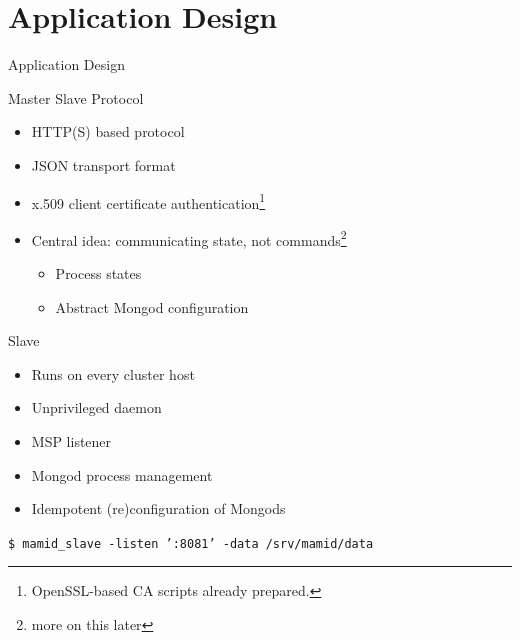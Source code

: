 \documentclass[11pt,aspectratio=169]{beamer}
\begin{document}
   
    
    \section{Application Design}
    
    \begin{frame}[label=appdesign]{Application Design}
    \end{frame}
       
   \begin{frame}{Master Slave Protocol}
       \begin{itemize}
           \item HTTP(S) based protocol
           \item JSON transport format
           \item x.509 client certificate authentication\footnote{OpenSSL-based CA scripts already prepared.}
           \item Central idea: communicating state, not commands\footnote{more on this later}
           \begin{itemize}
               \item Process states
               \item Abstract Mongod configuration
            \end{itemize}
        \end{itemize}
    \end{frame}
    

    \begin{frame}{Slave}
        
           \begin{itemize}
               \item Runs on every cluster host
               \item Unprivileged daemon
               \item MSP listener
               \item Mongod process management
               \item Idempotent (re)configuration of Mongods
            \end{itemize}
            \vspace{15pt}
            \texttt{\$ mamid\_slave -listen ':8081' -data /srv/mamid/data}
    \end{frame}
    
\end{document}
